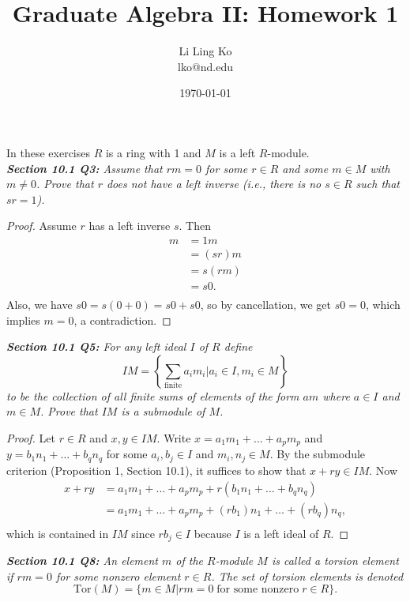 \documentclass{article}
\begin{document}
\title{Graduate Algebra II: Homework 1}
\author{Li Ling Ko\\ lko@nd.edu}
\date{\today}
\maketitle

In these exercises $R$ is a ring with 1 and $M$ is a left $R$-module. \\

\it \textbf{Section 10.1 Q3:} Assume that $rm=0$ for some $r\in R$ and some
  $m\in M$ with $m\neq0$. Prove that $r$ does not have a left inverse
  (i.e., there is no $s\in R$ such that $sr=1$).

  \begin{proof}
    Assume $r$ has a left inverse $s$. Then
    \begin{align*}
      m &= 1m \\
      &= (sr)m \\
      &= s(rm) \\
      &= s0. \\
    \end{align*}
    Also, we have $s0=s(0+0)=s0+s0$, so by cancellation, we get $s0=0$,
    which implies $m=0$, a contradiction.
  \end{proof}

\it \textbf{Section 10.1 Q5:} For any left ideal $I$ of $R$ define
  \[IM = \left\{\sum_{\text{finite}}a_im_i| a_i\in I, m_i\in M\right\}\]
  to be the collection of all finite sums of elements of the form $am$
  where $a\in I$ and $m\in M$. Prove that $IM$ is a submodule of $M$.

  \begin{proof}
    Let $r\in R$ and $x,y\in IM$. Write $x=a_1m_1+\ldots+a_pm_p$ and
    $y=b_1n_1+\ldots+b_qn_q$ for some $a_i,b_j\in I$ and $m_i,n_j\in M$.
    By the submodule criterion (Proposition 1, Section 10.1), it suffices
    to show that $x+ry\in IM$. Now
    \begin{align*}
      x+ry &=a_1m_1+\ldots+a_pm_p + r(b_1n_1+\ldots+b_qn_q) \\
      &=a_1m_1+\ldots+a_pm_p + (rb_1)n_1+\ldots+(rb_q)n_q, \\
    \end{align*}
    which is contained in $IM$ since $rb_j\in I$ because $I$ is a left
    ideal of $R$.
  \end{proof}

\it \textbf{Section 10.1 Q8:} An element $m$ of the $R$-module $M$ is
  called a torsion element if $rm=0$ for some nonzero element $r\in R$. The
  set of torsion elements is denoted
  \[\text{Tor}(M) = \{m\in M| rm=0\; \text{for some nonzero}\; r\in R\}.\]
\end{document}
